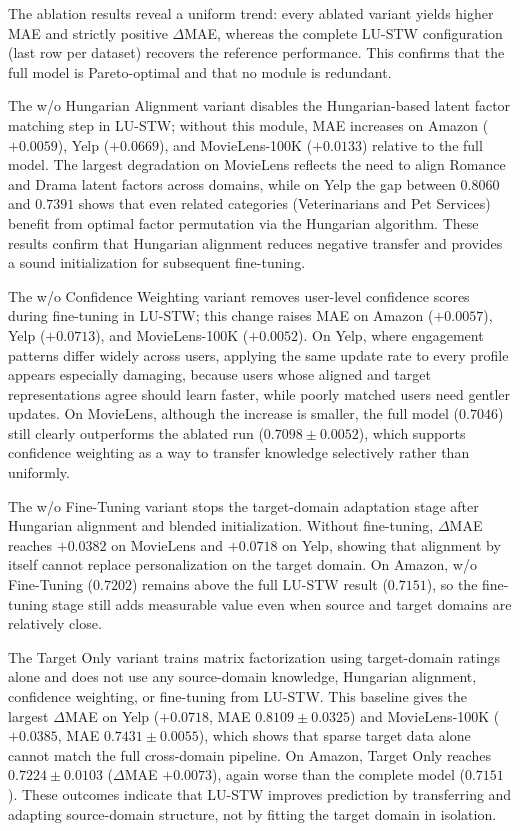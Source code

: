 The ablation results reveal a uniform trend: every ablated variant yields higher MAE and strictly positive $\Delta$MAE, whereas the complete LU-STW configuration (last row per dataset) recovers the reference performance. This confirms that the full model is Pareto-optimal and that no module is redundant.

The w/o Hungarian Alignment variant disables the Hungarian-based latent factor matching step in LU-STW; without this module, MAE increases on Amazon ($+0.0059$), Yelp ($+0.0669$), and MovieLens-100K ($+0.0133$) relative to the full model. The largest degradation on MovieLens reflects the need to align Romance and Drama latent factors across domains, while on Yelp the gap between $0.8060$ and $0.7391$ shows that even related categories (Veterinarians and Pet Services) benefit from optimal factor permutation via the Hungarian algorithm. These results confirm that Hungarian alignment reduces negative transfer and provides a sound initialization for subsequent fine-tuning.

The w/o Confidence Weighting variant removes user-level confidence scores during fine-tuning in LU-STW; this change raises MAE on Amazon ($+0.0057$), Yelp ($+0.0713$), and MovieLens-100K ($+0.0052$). On Yelp, where engagement patterns differ widely across users, applying the same update rate to every profile appears especially damaging, because users whose aligned and target representations agree should learn faster, while poorly matched users need gentler updates. On MovieLens, although the increase is smaller, the full model ($0.7046$) still clearly outperforms the ablated run ($0.7098 \pm 0.0052$), which supports confidence weighting as a way to transfer knowledge selectively rather than uniformly.

The w/o Fine-Tuning variant stops the target-domain adaptation stage after Hungarian alignment and blended initialization. Without fine-tuning, $\Delta$MAE reaches $+0.0382$ on MovieLens and $+0.0718$ on Yelp, showing that alignment by itself cannot replace personalization on the target domain. On Amazon, w/o Fine-Tuning ($0.7202$) remains above the full LU-STW result ($0.7151$), so the fine-tuning stage still adds measurable value even when source and target domains are relatively close.

The Target Only variant trains matrix factorization using target-domain ratings alone and does not use any source-domain knowledge, Hungarian alignment, confidence weighting, or fine-tuning from LU-STW. This baseline gives the largest $\Delta$MAE on Yelp ($+0.0718$, MAE $0.8109 \pm 0.0325$) and MovieLens-100K ($+0.0385$, MAE $0.7431 \pm 0.0055$), which shows that sparse target data alone cannot match the full cross-domain pipeline. On Amazon, Target Only reaches $0.7224 \pm 0.0103$ ($\Delta$MAE $+0.0073$), again worse than the complete model ($0.7151$). These outcomes indicate that LU-STW improves prediction by transferring and adapting source-domain structure, not by fitting the target domain in isolation.

